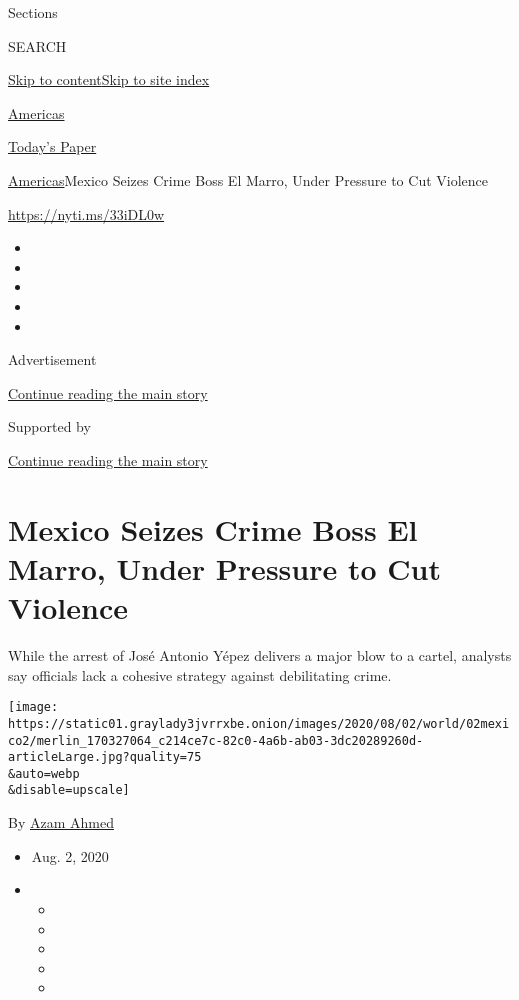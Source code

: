 Sections

SEARCH

\protect\hyperlink{site-content}{Skip to
content}\protect\hyperlink{site-index}{Skip to site index}

\href{https://www.nytimes3xbfgragh.onion/section/world/americas}{Americas}

\href{https://myaccount.nytimes3xbfgragh.onion/auth/login?response_type=cookie\&client_id=vi}{}

\href{https://www.nytimes3xbfgragh.onion/section/todayspaper}{Today's
Paper}

\href{/section/world/americas}{Americas}\textbar{}Mexico Seizes Crime
Boss El Marro, Under Pressure to Cut Violence

\url{https://nyti.ms/33iDL0w}

\begin{itemize}
\item
\item
\item
\item
\item
\end{itemize}

Advertisement

\protect\hyperlink{after-top}{Continue reading the main story}

Supported by

\protect\hyperlink{after-sponsor}{Continue reading the main story}

\hypertarget{mexico-seizes-crime-boss-el-marro-under-pressure-to-cut-violence}{%
\section{Mexico Seizes Crime Boss El Marro, Under Pressure to Cut
Violence}\label{mexico-seizes-crime-boss-el-marro-under-pressure-to-cut-violence}}

While the arrest of José Antonio Yépez delivers a major blow to a
cartel, analysts say officials lack a cohesive strategy against
debilitating crime.

\texttt{[image: https://static01.graylady3jvrrxbe.onion/images/2020/08/02/world/02mexico2/merlin\_170327064\_c214ce7c-82c0-4a6b-ab03-3dc20289260d-articleLarge.jpg?quality=75\\\&auto=webp\\\&disable=upscale]}

By \href{https://www.nytimes3xbfgragh.onion/by/azam-ahmed}{Azam Ahmed}

\begin{itemize}
\item
  Aug. 2, 2020
\item
  \begin{itemize}
  \item
  \item
  \item
  \item
  \item
  \end{itemize}
\end{itemize}

